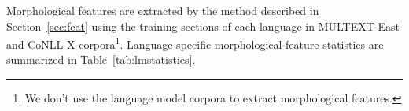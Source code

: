 Morphological features are extracted by the method described in
Section~\ref{sec:feat} using the training sections of each language in
MULTEXT-East and CoNLL-X corpora\footnote{We don't use the language
  model corpora to extract morphological features.}.  Language
specific morphological feature statistics are summarized in
Table~\ref{tab:lmstatistics}.


